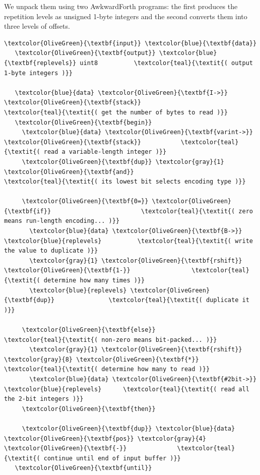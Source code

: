 \documentclass{webofc}
\begin{document}
We unpack them using two AwkwardForth programs: the first produces the repetition levels as unsigned 1-byte integers and the second converts them into three levels of offsets.

\small
\begin{Verbatim}[commandchars=\\\{\}]
   \textcolor{OliveGreen}{\textbf{input}} \textcolor{blue}{\textbf{data}}
   \textcolor{OliveGreen}{\textbf{output}} \textcolor{blue}{\textbf{replevels}} uint8          \textcolor{teal}{\textit{( output 1-byte integers )}}

   \textcolor{blue}{data} \textcolor{OliveGreen}{\textbf{I->}} \textcolor{OliveGreen}{\textbf{stack}}                  \textcolor{teal}{\textit{( get the number of bytes to read )}}
   \textcolor{OliveGreen}{\textbf{begin}}
     \textcolor{blue}{data} \textcolor{OliveGreen}{\textbf{varint->}} \textcolor{OliveGreen}{\textbf{stack}}           \textcolor{teal}{\textit{( read a variable-length integer )}}
     \textcolor{OliveGreen}{\textbf{dup}} \textcolor{gray}{1} \textcolor{OliveGreen}{\textbf{and}}                     \textcolor{teal}{\textit{( its lowest bit selects encoding type )}}

     \textcolor{OliveGreen}{\textbf{0=}} \textcolor{OliveGreen}{\textbf{if}}                         \textcolor{teal}{\textit{( zero means run-length encoding... )}}
       \textcolor{blue}{data} \textcolor{OliveGreen}{\textbf{B->}} \textcolor{blue}{replevels}          \textcolor{teal}{\textit{( write the value to duplicate )}}
       \textcolor{gray}{1} \textcolor{OliveGreen}{\textbf{rshift}} \textcolor{OliveGreen}{\textbf{1-}}                 \textcolor{teal}{\textit{( determine how many times )}}
       \textcolor{blue}{replevels} \textcolor{OliveGreen}{\textbf{dup}}               \textcolor{teal}{\textit{( duplicate it )}}

     \textcolor{OliveGreen}{\textbf{else}}                          \textcolor{teal}{\textit{( non-zero means bit-packed... )}}
       \textcolor{gray}{1} \textcolor{OliveGreen}{\textbf{rshift}} \textcolor{gray}{8} \textcolor{OliveGreen}{\textbf{*}}                \textcolor{teal}{\textit{( determine how many to read )}}
       \textcolor{blue}{data} \textcolor{OliveGreen}{\textbf{#2bit->}} \textcolor{blue}{replevels}      \textcolor{teal}{\textit{( read all the 2-bit integers )}}
     \textcolor{OliveGreen}{\textbf{then}}

     \textcolor{OliveGreen}{\textbf{dup}} \textcolor{blue}{data} \textcolor{OliveGreen}{\textbf{pos}} \textcolor{gray}{4} \textcolor{OliveGreen}{\textbf{-}}              \textcolor{teal}{\textit{( continue until end of input buffer )}}
   \textcolor{OliveGreen}{\textbf{until}}
\end{Verbatim}
\normalsize
\end{document}
